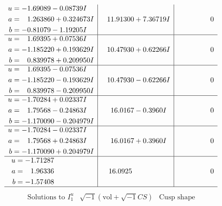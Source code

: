 \documentclass[1p]{elsarticle_modified}
\theoremstyle{definition}
\newcommand{\I}{\sqrt{-1}}
\begin{document}
$$\begin{array}{c|c|c}
\begin{aligned}
u &= -1.69089 - 0.08739 I \\
a &= \phantom{-}1.263860 + 0.324673 I \\
b &= -0.81079 - 1.19205 I\end{aligned}
 & \phantom{-}11.91300 + 7.36719 I & \phantom{-0.000000 } 0 \\ \hline\begin{aligned}
u &= \phantom{-}1.69395 + 0.07536 I \\
a &= -1.185220 + 0.193629 I \\
b &= \phantom{-}0.839978 + 0.209950 I\end{aligned}
 & \phantom{-}10.47930 + 0.62266 I & \phantom{-0.000000 } 0 \\ \hline\begin{aligned}
u &= \phantom{-}1.69395 - 0.07536 I \\
a &= -1.185220 - 0.193629 I \\
b &= \phantom{-}0.839978 - 0.209950 I\end{aligned}
 & \phantom{-}10.47930 - 0.62266 I & \phantom{-0.000000 } 0 \\ \hline\begin{aligned}
u &= -1.70284 + 0.02337 I \\
a &= \phantom{-}1.79568 - 0.24863 I \\
b &= -1.170090 - 0.204979 I\end{aligned}
 & \phantom{-}16.0167 - 0.3960 I & \phantom{-0.000000 } 0 \\ \hline\begin{aligned}
u &= -1.70284 - 0.02337 I \\
a &= \phantom{-}1.79568 + 0.24863 I \\
b &= -1.170090 + 0.204979 I\end{aligned}
 & \phantom{-}16.0167 + 0.3960 I & \phantom{-0.000000 } 0 \\ \hline\begin{aligned}
u &= -1.71287\phantom{ +0.000000I} \\
a &= \phantom{-}1.96336\phantom{ +0.000000I} \\
b &= -1.57408\phantom{ +0.000000I}\end{aligned}
 & \phantom{-}16.0925\phantom{ +0.000000I} & \phantom{-0.000000 } 0\\
 \hline 
 \end{array}$$\newpage$$\begin{array}{c|c|c}  
\text{Solutions to }I^u_{1}& \I (\text{vol} + \sqrt{-1}CS) & \text{Cusp shape}\\

\end{array}$$
\end{document}
